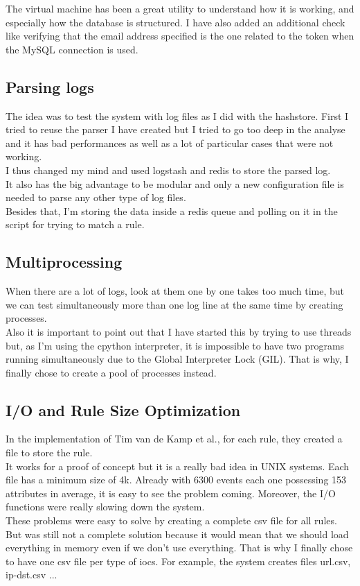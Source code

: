 \documentclass{eplmastersthesis}
\begin{document}
The virtual machine has been a great utility to understand how it is working, and especially how the database is structured. I have also added an additional check like verifying that the email address specified is the one related to the token when the MySQL connection is used.

\subsection{Parsing logs}
The idea was to test the system with log files as I did with the hashstore. First I tried to reuse the parser I have created but I tried to go too deep in the analyse and it has bad performances as well as a lot of particular cases that were not working.\\
I thus changed my mind and used logstash and redis to store the parsed log. \\
It also has the big advantage to be modular and only a new configuration file is needed to parse any other type of log files.\\
Besides that, I'm storing the data inside a redis queue and polling on it in the script for trying to match a rule. \\

\subsection{Multiprocessing}
When there are a lot of logs, look at them one by one takes too much time, but we can test simultaneously more than one log line at the same time by creating processes.\\
Also it is important to point out that I have started this by trying to use threads but, as I'm using the cpython interpreter, it is impossible to have two programs running simultaneously due to the Global Interpreter Lock (GIL). That is why, I finally chose to create a pool of processes instead.

\subsection{I/O and Rule Size Optimization}
In the implementation of Tim van de Kamp et al., for each rule, they created a file to store the rule. \\
It works for a proof of concept but it is a really bad idea in UNIX systems. Each file has a minimum size of 4k. Already with 6300 events each one possessing 153 attributes in average, it is easy to see the problem coming. Moreover, the I/O functions were really slowing down the system. \\
These problems were easy to solve by creating a complete \gls{csv} file for all rules. But was still not a complete solution because it would mean that we should load everything in memory even if we don't use everything. That is why I finally chose to have one \gls{csv} file per type of \gls{ioc}s. For example, the system creates files url.csv, ip-dst.csv ...
\end{document}
